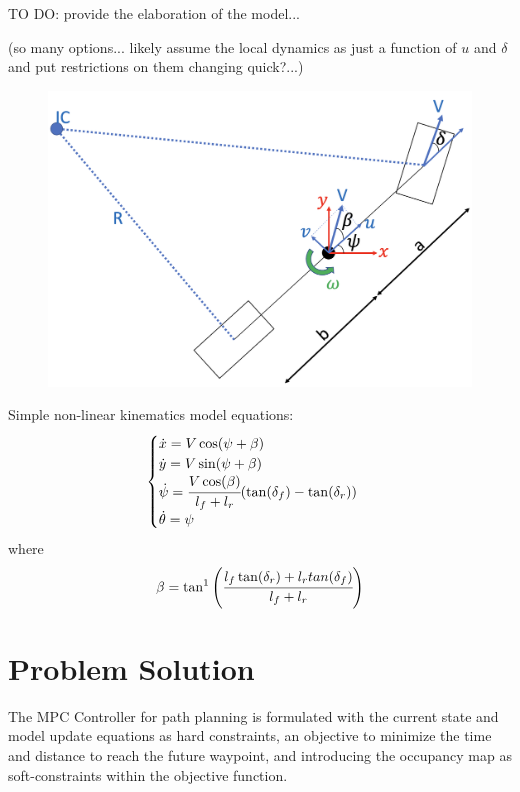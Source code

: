 \documentclass[]{IEEEtran}
\begin{document}
TO DO: 
provide the elaboration of the model...

(so many options... likely assume the local dynamics as just a function of $u$ and $\delta$ and put restrictions on them changing quick?...)


\begin{figure}[h]
    \centering
    \includegraphics[width=\columnwidth]{figs/BicycleModel.png}
    \caption{}
    \label{fig:bikeModel_diagram}
\end{figure}

Simple non-linear kinematics model equations:
\begin{equation}
    \begin{cases}
        \dot{x} = V \cos(\psi + \beta)\\
        \dot{y} = V \sin(\psi + \beta)\\
        \dot{\psi} = \cfrac{V \cos(\beta)}{l_f + l_r} \qty(\tan(\delta_f) - \tan(\delta_r))\\
        \dot{\theta} = \psi
    \end{cases}
\end{equation}
where
\begin{equation}
    \beta = \tan^{1}\qty(\cfrac{l_f \tan(\delta_r) + l_r tan(\delta_f)}{l_f + l_r})
\end{equation}







\section{Problem Solution}
\label{sec:pblm_soln}
The MPC Controller for path planning is formulated with the current state and model update equations as hard constraints, an objective to minimize the time and distance to reach the future waypoint, and introducing the occupancy map as soft-constraints within the objective function.
\end{document}
